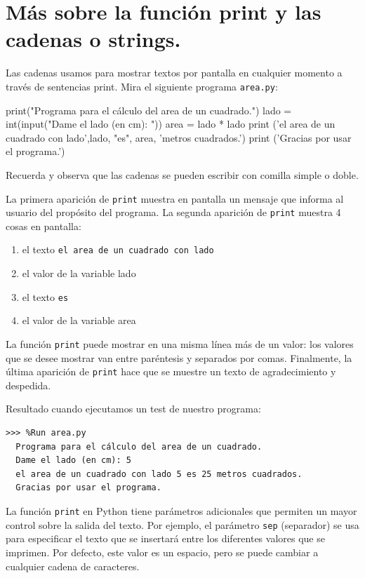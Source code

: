 \section{Más sobre la función print y las cadenas o strings.}

Las cadenas usamos para mostrar textos por pantalla en cualquier momento a través de sentencias print.
%
Mira el siguiente programa \verb|area.py|:\\


\begin{python}
print("Programa para el cálculo del area de un cuadrado.")
lado = int(input("Dame el lado (en cm): "))
area = lado * lado
print ('el area de un cuadrado con lado',lado, "es", area, 'metros cuadrados.')
print ('Gracias por usar el programa.')
\end{python}

Recuerda y observa que las cadenas se pueden escribir con comilla simple o doble.

La primera aparición de \verb+print+ muestra en pantalla un mensaje que informa al usuario del propósito del programa. 
%
La segunda aparición de \verb+print+ muestra 4 cosas en pantalla: 

\begin{enumerate}[nosep]
    \item el texto \verb|el area de un cuadrado con lado|
    \item el valor de la variable lado
    \item el texto \verb|es|
    \item el valor de la variable area
\end{enumerate}

La función \verb+print+ puede mostrar en una misma línea más de un valor: los valores que se desee mostrar van entre paréntesis y separados por comas. 
%
Finalmente, la última aparición de \verb+print+ hace que se muestre un texto de agradecimiento y despedida. 

Resultado cuando ejecutamos un test de nuestro programa:

\begin{Verbatim}[frame=single]
>>> %Run area.py
  Programa para el cálculo del area de un cuadrado.
  Dame el lado (en cm): 5
  el area de un cuadrado con lado 5 es 25 metros cuadrados.
  Gracias por usar el programa.
\end{Verbatim}

La función \verb|print| en Python tiene parámetros adicionales que permiten un mayor control sobre la salida del texto. Por ejemplo, el parámetro \verb|sep| (separador) se usa para especificar el texto que se insertará entre los diferentes valores que se imprimen. Por defecto, este valor es un espacio, pero se puede cambiar a cualquier cadena de caracteres.

